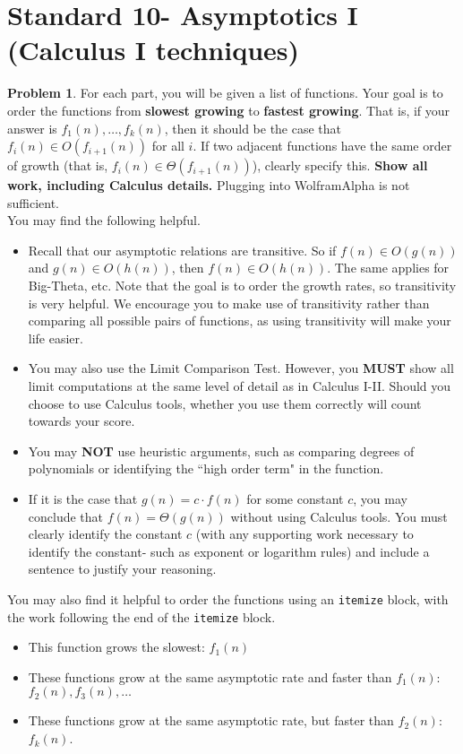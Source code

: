 \documentclass[11pt]{article}
\theoremstyle{definition}
\theoremstyle{definition}
\newtheorem{required}{Problem}
\theoremstyle{definition}
\begin{document}
\section{Standard 10- Asymptotics I (Calculus I techniques)}
\begin{required}
For each part, you will be given a list of functions. Your goal is to order the functions from \textbf{slowest growing} to \textbf{fastest growing}. That is, if your answer is $f_{1}(n), \ldots, f_{k}(n)$, then it should be the case that $f_{i}(n) \in O(f_{i+1}(n))$ for all $i$. If two adjacent functions have the same order of growth (that is, $f_{i}(n) \in \Theta(f_{i+1}(n))$), clearly specify this. \textbf{Show all work, including Calculus details.} Plugging into WolframAlpha is not sufficient. \\

\noindent You may find the following helpful.
\begin{itemize}
\item Recall that our asymptotic relations are transitive. So if $f(n) \in O(g(n))$ and $g(n) \in O(h(n))$, then $f(n) \in O(h(n))$. The same applies for Big-Theta, etc. Note that the goal is to order the growth rates, so transitivity is very helpful. We encourage you to make use of transitivity rather than comparing all possible pairs of functions, as using transitivity will make your life easier.

\item You may also use the Limit Comparison Test. However, you \textbf{MUST} show all limit computations at the same level of detail as in Calculus I-II. Should you choose to use Calculus tools, whether you use them correctly will count towards your score.

\item You may \textbf{NOT} use heuristic arguments, such as comparing degrees of polynomials or identifying the ``high order term" in the function.

\item If it is the case that $g(n) = c \cdot f(n)$ for some constant $c$, you may conclude that $f(n) = \Theta(g(n))$ without using Calculus tools. You must clearly identify the constant $c$ (with any supporting work necessary to identify the constant- such as exponent or logarithm rules) and include a sentence to justify your reasoning. 
\end{itemize}


\noindent You may also find it helpful to order the functions using an \texttt{itemize} block, with the work following the end of the \texttt{itemize} block.
\begin{itemize}
\item This function grows the slowest: $f_{1}(n)$
\item These functions grow at the same asymptotic rate and faster than $f_{1}(n)$: $f_{2}(n), f_{3}(n), \ldots$
\item These functions grow at the same asymptotic rate, but faster than $f_{2}(n)$: $f_{k}(n)$.
\end{itemize}



\end{required}
\end{document}
